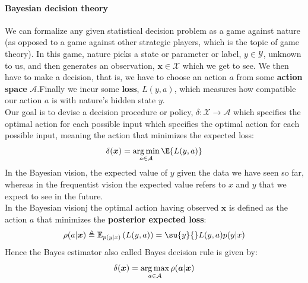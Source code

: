 \paragraph{Bayesian decision theory}
We can formalize any given statistical decision problem as a game against nature (as 
opposed to a game against other strategic players, which is the topic of game theory).
In this game, nature picks a state or parameter or label, $y\in \mathcal{Y}$, unknown to 
us, and then generates an observation, $\bm{x}\in\mathcal{X}$ which we get to see. We then
have to make a decision, that is, we have to choose an action $a$ from some \textbf{action
space} $\mathcal{A}$.Finally we incur some \textbf{loss}, $L(y, a)$, which measures how
compatible our action $a$ is with nature's hidden state $y$.\\
Our goal is to devise a decision procedure or policy, $\delta: \mathcal{X}\rightarrow
\mathcal{A}$ which specifies the optimal action for each possible input which specifies the optimal action for each possible input, meaning the action that minimizes the expected 
loss:
$$ \delta(\bm{x}) = \argmin_{{a\in \mathcal{A}}} \E{{L(y, a)}}$$
In the Bayesian vision, the expected value of $y$ given the data we have seen so far, 
whereas in the frequentist vision the expected value refers to $x$ and $y$ that we expect
to see in the future.\\
In the Bayesian visionj the optimal action having observed $\bm{x}$ is defined as the 
action $a$ that minimizes the \textbf{posterior expected loss}:
$$ \rho(a|\bm{x})\triangleq\mathbb{E}_{p(y|x)}\left(L(y, a)\right) = \su{y}{}L(y, a)
p(y|x)$$
Hence the Bayes estimator also called Bayes decision rule is given by:
$$\delta(\bm{x}) = \operatorname*{arg\,max}_{a\in\mathcal{A}}\rho(\bm{a}|\bm{x})$$

